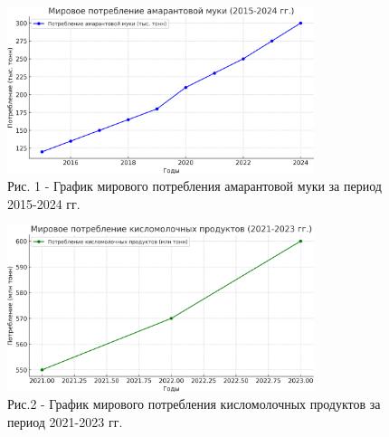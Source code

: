 \begin{figure}[H]
	\centering
	\includegraphics[width=0.8\textwidth]{media/pish2/image20}
	\caption*{Рис. 1 - График мирового потребления амарантовой муки за период 2015-2024 гг.}
\end{figure}

\begin{figure}[H]
	\centering
	\includegraphics[width=0.8\textwidth]{media/pish2/image21}
	\caption*{Рис.2 - График мирового потребления кисломолочных продуктов за период 2021-2023 гг.}
\end{figure}

